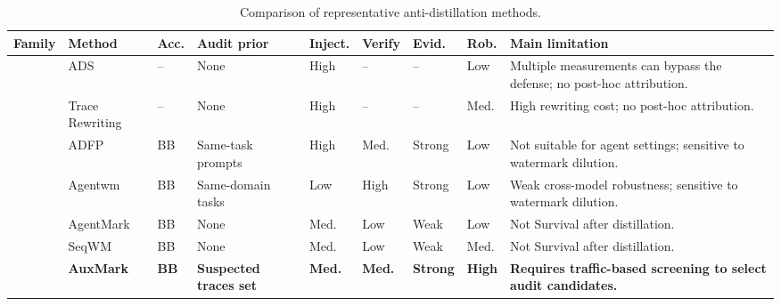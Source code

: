\begin{table}[!t]
\centering
\caption{Comparison of representative anti-distillation methods.}
\label{tab:anti-distillation-comparison}
\begin{threeparttable}
\scriptsize
\setlength{\tabcolsep}{2.5pt}
\renewcommand{\tabularxcolumn}[1]{m{#1}}

\begin{tabularx}{\textwidth}{
    @{}
    >{\raggedright\arraybackslash}m{1.55cm}
    >{\raggedright\arraybackslash}m{1.65cm}
    >{\centering\arraybackslash}m{0.65cm}
    >{\raggedright\arraybackslash}m{2.15cm}
    >{\centering\arraybackslash}m{0.70cm}
    >{\centering\arraybackslash}m{0.75cm}
    >{\centering\arraybackslash}m{0.80cm}
    >{\centering\arraybackslash}m{0.75cm}
    Y
    @{}
}
\toprule
\textbf{Family} &
\textbf{Method} &
\textbf{Acc.} &
\textbf{Audit prior} &
\textbf{Inject.} &
\textbf{Verify} &
\textbf{Evid.} &
\textbf{Rob.} &
\textbf{Main limitation} \\
\midrule

 &
ADS &
-- &
None &
High &
-- &
-- &
Low &
Multiple measurements can bypass the defense; no post-hoc attribution. \\

&
Trace Rewriting &
-- &
None &
High &
-- &
-- &
Med. &
High rewriting cost; no post-hoc attribution. \\

\midrule

 &
ADFP &
BB &
Same-task prompts &
High &
Med. &
Strong &
Low &
Not suitable for agent settings; sensitive to watermark dilution. \\

&
Agentwm &
BB &
Same-domain tasks &
Low &
High &
Strong &
Low &
Weak cross-model robustness; sensitive to watermark dilution.\\

&
AgentMark &
BB &
None &
Med. &
Low &
Weak &
Low &
Not Survival after distillation. \\

&
SeqWM &
BB &
None &
Med. &
Low &
Weak &
Med. &
Not Survival after distillation. \\

 &
\textbf{AuxMark} &
\textbf{BB} &
\textbf{Suspected traces set} &
\textbf{Med.} &
\textbf{Med.} &
\textbf{Strong} &
\textbf{High} &
\textbf{Requires traffic-based screening to select audit candidates.} \\


\end{tabularx}
\end{threeparttable}
\end{table}
